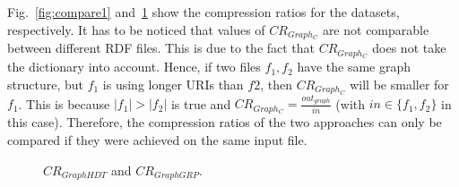 Fig.~\ref{fig:compare1} and~\ref{fig:compare2} show the compression ratios for the datasets, respectively. It has to be noticed that values of $CR_{Graph_C}$ are not comparable between different RDF files. This is due to the fact that $CR_{Graph_C}$ does not take the dictionary into account. Hence, if two files $f_1,f_2$ have the same graph structure, but $f_1$  is using longer URIs than $f2$, then $CR_{Graph_C}$ will be smaller for $f_1$. This is because $|f_1|>|f_2|$ is true and $CR_{Graph_C}=\frac{out_{graph}}{in}$ (with $in\in \{f_1,f_2\}$ in this case). Therefore, the compression ratios of the two approaches can only be compared if they were achieved on the same input file.


\begin{figure}[h]
	\centering
	\hfill
	\caption{$CR_{Graph{HDT}}$ and $CR_{Graph{GRP}}$.}
	\label{fig:compare2}
\end{figure}

